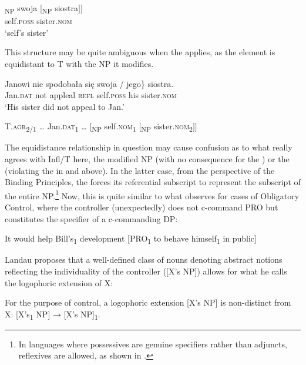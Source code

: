 \documentclass[output=paper,nonflat,colorlinks,citecolor=brown,newtxmath]{langsci/langscibook}
\begin{document}
\ea \label{ex:witkos:58}{
\gll {[}\textsubscript{NP} swoja [\textsubscript{NP} siostra$]]$\\
     {} self.\textsc{poss} {} sister.\textsc{nom}\\
\glt `self's sister'
}
\z

\noindent This structure may be quite ambiguous when the  applies, as the  element is equidistant to T with the NP it modifies.

\ea \label{ex:witkos:59}{
\gll Janowi nie spodobała się \minsp{\{*} swoja / jego\} siostra.\\
     Jan.\textsc{dat} not appleal \textsc{refl} {} self.\textsc{poss} {} his sister.\textsc{nom}\\
\glt `His sister did not appeal to Jan.'
}
\z

\ea \label{ex:witkos:60}
T.\textsc{agr}\textsubscript{2/1} {\dots} Jan.\textsc{dat}\textsubscript{1} {\dots} [\textsubscript{NP} self.\textsc{nom}\textsubscript{1} [\textsubscript{NP} sister.\textsc{nom}\textsubscript{2}$]]$\\
\z

\noindent The equidistance relationship in question may cause confusion as to what really agrees with Infl/T here, the modified NP (with no consequence for the ) or the   (violating the  in  and  above). In the latter case, from the perspective of the Binding Principles, the  forces its referential subscript to represent the subscript of the entire NP.\footnote{\label{fn31}In languages where possessives are genuine specifiers rather than adjuncts,  reflexives are allowed, as shown in \cite[273--274]{woolford1999}.} Now, this is quite similar to what \cite[109--111]{landau2000} observes for cases of Obligatory Control, where the controller (unexpectedly) does not c-command PRO but constitutes the specifier of a c-commanding DP:

\ea \label{ex:witkos:61}
It would help Bill’s\textsubscript{1} development [PRO\textsubscript{1} to behave himself\textsubscript{1} in public]\\
\z

\noindent Landau proposes that a well-defined class of nouns denoting abstract notions reflecting the individuality of the controller ([X’s NP]) allows for what he calls the logophoric extension of X:

\ea \label{ex:witkos:62}
For the purpose of control, a logophoric extension [X’s NP] is non-distinct from X: [X’s\textsubscript{1} NP] → [X’s NP]\textsubscript{1}.\\
\z
\end{document}
